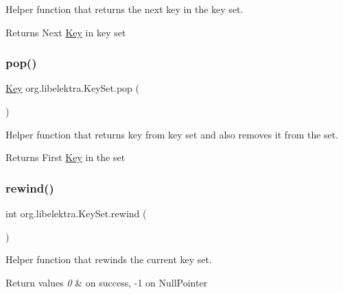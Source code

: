 Helper function that returns the next key in the key set. 

\begin{DoxyReturn}{Returns}
Next \hyperlink{classorg_1_1libelektra_1_1Key}{Key} in key set 
\end{DoxyReturn}
\mbox{\label{classorg_1_1libelektra_1_1KeySet_a6fcb652d72c64772bae40ec801d93ad9}} 
\subsubsection{\texorpdfstring{pop()}{pop()}}
{\footnotesize\ttfamily \hyperlink{classorg_1_1libelektra_1_1Key}{Key} org.\+libelektra.\+Key\+Set.\+pop (\begin{DoxyParamCaption}{ }\end{DoxyParamCaption})\hspace{0.3cm}{\ttfamily [inline]}}



Helper function that returns key from key set and also removes it from the set. 

\begin{DoxyReturn}{Returns}
First \hyperlink{classorg_1_1libelektra_1_1Key}{Key} in the set 
\end{DoxyReturn}
\mbox{\label{classorg_1_1libelektra_1_1KeySet_a20533a5e97b16b76b977b95be179d58c}} 
\subsubsection{\texorpdfstring{rewind()}{rewind()}}
{\footnotesize\ttfamily int org.\+libelektra.\+Key\+Set.\+rewind (\begin{DoxyParamCaption}{ }\end{DoxyParamCaption})\hspace{0.3cm}{\ttfamily [inline]}}



Helper function that rewinds the current key set. 


\begin{DoxyRetVals}{Return values}
{\em 0} & on success, -\/1 on Null\+Pointer \\
\hline
\end{DoxyRetVals}
\mbox{\label{classorg_1_1libelektra_1_1KeySet_adb3caad35c8dfcd1934d7cd32ff0ca4a}} 
